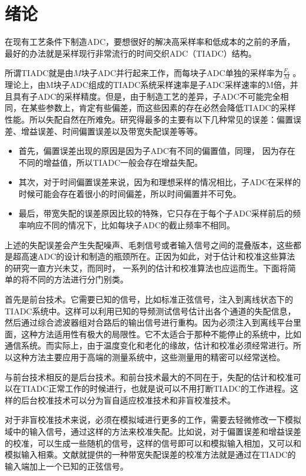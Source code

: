 


\chapter{绪论}

在现有工艺条件下制造ADC，要想很好的解决高采样率和低成本的之前的矛盾，最好的办法就是采样现行非常流行的时间交织ADC（TIADC）结构\cite{black1980time}。

所谓TIADC就是由$M$块子ADC并行起来工作，而每块子ADC单独的采样率为$\frac{F_s}{M}$
。理论上，由M块子ADC组成的TIADC系统采样速率是子ADC采样速率的M倍，并且具有子ADC的采样精度。但是，由于制造工艺的差异，子ADC不可能完全相同，在某些参数上，肯定有些偏差，而这些因素的存在必然会降低TIADC的采样性能。所以失配自然在所难免。研究得最多的主要有以下几种常见的误差：偏置误差、增益误差、时间偏置误差以及带宽失配误差等等。
\begin{itemize}
\item 首先，偏置误差出现的原因是因为子ADC有不同的偏置值，同理， 因为存在不同的增益值，所以TIADC一般会存在增益失配。
\item 其次，对于时间偏置误差来说，因为和理想采样的情况相比，子ADC在采样的时候可能会存在着很小的时间偏差，所以时间偏置并不可免。
\item 最后，带宽失配的误差原因比较的特殊，它只存在于每个子ADC采样前后的频率响应不同的情况下，比如每块子ADC的截止频率不相同。
\end{itemize}
上述的失配误差会产生失配噪声、毛刺信号或者输入信号之间的混叠版本，这些都是超高速ADC的设计和制造的瓶颈所在。正因为如此，对于估计和校准这些算法的研究一直方兴未艾，而同时， 一系列的估计和校准算法也应运而生。下面将简单的将不同的方法进行分门别类。\par
首先是前台技术。它需要已知的信号，比如标准正弦信号，注入到离线状态下的TIADC系统中。这样可以利用已知的导频测试信号估计出各个通道的失配信息，然后通过综合滤波器组对合路后的输出信号进行重构。因为必须注入到离线平台里面，这种方法适用性有极大的局限性。它不太适合于那种不能停止的系统中，比如通信系统。而实际上，由于温度变化和老化的缘故，估计和校准必须经常进行。所以这种方法主要应用于高端的测量系统中，这些测量用的精密可以经常送检。\par
与前台技术相反的是后台技术。和前台技术最大的不同在于，失配的估计和校准可以在TIADC正常工作的时候进行，也就是说可以不用打断TIADC的工作进程。这样的后台校准技术可以分为盲自适应校准技术和非盲校准技术。\par
对于非盲校准技术来说，必须在模拟域进行更多的工作，需要去轻微修改一下模拟域中的输入信号，通过这样的方法来校准失配。比如说，对于偏置误差和增益误差的校准，可以生成一些随机的信号，这样的信号即可以和模拟输入相加，又可以和模拟输入相乘。文献就提供的一种带宽失配误差的校准方法就是通过在TIADC的输入端加上一个已知的正弦信号。\par



